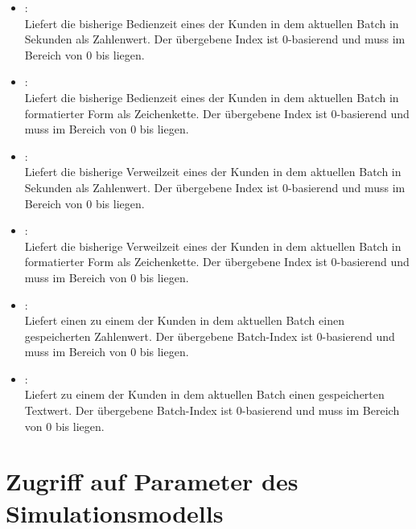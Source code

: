\begin{itemize}
\item
{}:\\
Liefert die bisherige Bedienzeit eines der Kunden in dem aktuellen Batch in Sekunden als Zahlenwert.
Der übergebene Index ist 0-basierend und muss im Bereich von 0 bis  liegen.

\item
{}:\\
Liefert die bisherige Bedienzeit eines der Kunden in dem aktuellen Batch in formatierter Form als Zeichenkette.
Der übergebene Index ist 0-basierend und muss im Bereich von 0 bis  liegen.
	 
\item
{}:\\
Liefert die bisherige Verweilzeit eines der Kunden in dem aktuellen Batch in Sekunden als Zahlenwert.
Der übergebene Index ist 0-basierend und muss im Bereich von 0 bis  liegen.

\item
{}:\\
Liefert die bisherige Verweilzeit eines der Kunden in dem aktuellen Batch in formatierter Form als Zeichenkette.
Der übergebene Index ist 0-basierend und muss im Bereich von 0 bis  liegen.

\item
{}:\\
Liefert einen zu einem der Kunden in dem aktuellen Batch einen gespeicherten Zahlenwert.
Der übergebene Batch-Index ist 0-basierend und muss im Bereich von 0 bis  liegen.

\item
{}:\\
Liefert zu einem der Kunden in dem aktuellen Batch einen gespeicherten Textwert.
Der übergebene Batch-Index ist 0-basierend und muss im Bereich von 0 bis  liegen.

\end{itemize}

\section{Zugriff auf Parameter des Simulationsmodells}

